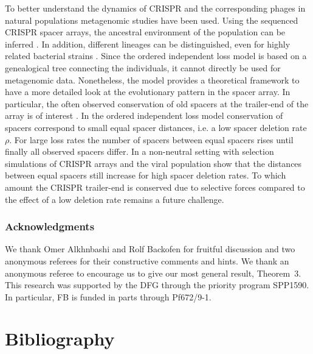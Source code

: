 \documentclass[preprint,authoryear]{elsarticle}
\theoremstyle{definition}
\numberwithin{equation}{section}
\numberwithin{figure}{section}
\begin{document}
To better understand the dynamics of CRISPR and the corresponding phages in natural populations 
metagenomic studies have been used.
Using the sequenced CRISPR spacer arrays, the ancestral environment of the population can be inferred \citep{Sun2015}.
In addition, different lineages can be distinguished, even for highly related bacterial strains \citep{Kunin2008}.
Since the ordered independent loss model is based on a genealogical tree connecting the individuals, it cannot directly be used for metagenomic data.
Nonetheless, the model provides a theoretical framework to have a more detailed look at the evolutionary pattern in the spacer array.
In particular, the often observed conservation of old spacers at the trailer-end of the array is of interest \citep{Weinberger2012}.
In the ordered independent loss model conservation of spacers correspond to small equal spacer distances, i.e. a low spacer deletion rate $\rho$.
For large loss rates the number of spacers between equal spacers rises until finally all observed spacers differ.
In a non-neutral setting with selection simulations of CRISPR arrays and the viral population show that the distances between equal spacers still increase for high spacer deletion rates.
To which amount the CRISPR trailer-end is conserved due to selective forces compared to the effect of a low deletion rate remains a future challenge.



\subsubsection*{Acknowledgments}
We thank Omer Alkhnbashi and Rolf Backofen for fruitful discussion
and two anonymous referees for their constructive comments and hints.
We thank an anonymous referee to encourage us to give our most general result, Theorem~3.
This research was supported by the DFG through the priority program
SPP1590. In particular, FB is funded in parts through Pf672/9-1.

\section*{Bibliography}


\end{document}
